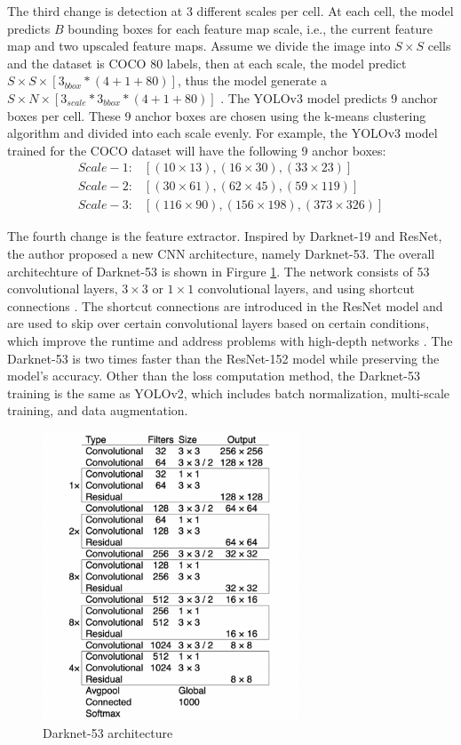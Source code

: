 The third change is detection at 3 different scales per cell. At each cell, the model predicts $B$ bounding boxes for each feature map scale, i.e., the current feature map and two upscaled feature maps. Assume we divide the image into $S \times S$ cells and the dataset is COCO 80 labels, then at each scale, the model predict $S \times S \times [3_{bbox} * (4 + 1 + 80)]$, thus the model generate a $S \times N \times [3_{scale} * 3_{bbox} * (4 + 1 + 80)]$ \cite{yolov3_2018}. The YOLOv3 model predicts 9 anchor boxes per cell. These 9 anchor boxes are chosen using the k-means clustering algorithm and divided into each scale evenly. For example, the YOLOv3 model trained for the COCO dataset will have the following 9 anchor boxes:
\begin{align*}
    Scale-1: &[(10 \times 13), (16 \times 30), (33 \times 23)] \\
    Scale-2: &[(30 \times 61), (62 \times 45), (59 \times 119)] \\
    Scale-3: &[(116  \times  90), (156  \times  198), (373  \times  326)]    
\end{align*}
    
The fourth change is the feature extractor. Inspired by Darknet-19 and ResNet, the author proposed a new CNN architecture, namely Darknet-53. The overall architechture of Darknet-53 is shown in Firgure \ref{fig:darknet53_archite}. The network consists of 53 convolutional layers, $3 \times 3$ or $1 \times 1$ convolutional layers, and using shortcut connections \cite{yolov3_2018}. The shortcut connections are introduced in the ResNet model and are used to skip over certain convolutional layers based on certain conditions, which improve the runtime and address problems with high-depth networks \cite{resnet_2016}. The Darknet-53 is two times faster than the ResNet-152 model while preserving the model's accuracy. Other than the loss computation method, the Darknet-53 training is the same as YOLOv2, which includes batch normalization, multi-scale training, and data augmentation.
\begin{figure}[!ht]
    \centering
    \includegraphics[width=3in]{figures/darknet53_archite.png}
    \caption{Darknet-53 architecture \cite{yolov3_2018}} 
    \label{fig:darknet53_archite}
\end{figure}